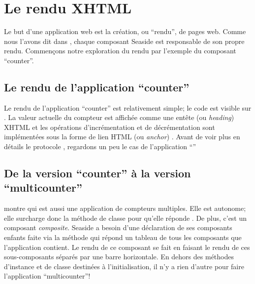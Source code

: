 \documentclass[a4paper,10pt,twoside]{book}
\begin{document}
\section{Le rendu XHTML}

Le but d'une application web est la création, ou ``rendu'', de pages web.
Comme nous l'avons dit dans , chaque composant
Seaside est responsable de son propre rendu.
Commençons notre exploration du rendu par l'exemple du composant ``counter''.

\subsection{Le rendu de l'application ``counter''}

Le rendu de l'application ``counter'' est relativement simple; le code
est visible sur .
La valeur actuelle du compteur est affichée comme une entête (ou
\emph{heading}) XHTML et les opérations d'incrémentation et de
décrémentation sont implémentées sous la forme de lien HTML (ou
\emph{anchor}) .
Avant de voir plus en détails le protocole , regardons
un peu le cas de l'application ``''

\subsection{De la version ``counter'' à la version ``multicounter''}

 montre  qui est
aussi une application
de compteurs multiples. Elle est 
autonome; elle surcharge donc la méthode de
classe  pour qu'elle réponde
.
De plus, c'est un composant \emph{composite}. Seaside a besoin d'une
déclaration de ses composants enfants faite via la méthode
 qui répond un tableau de tous les composants que
l'application contient.
Le rendu de ce composant se fait en faisant le rendu de ces
sous-composants séparés par une barre horizontale.
En dehors des méthodes d'instance et de classe destinées à
l'initialisation, il n'y a rien d'autre pour faire l'application
``multicounter''!
\end{document}
